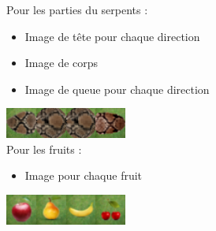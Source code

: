\documentclass{beamer}
\begin{document}
\begin{frame}
\frametitle{\insertsubsection}
\framesubtitle{\insertsection}
Pour les parties du serpents :
\begin{itemize}
\item Image de tête pour chaque direction  
\item Image de corps 
\item Image de queue pour chaque direction
\end{itemize}
\includegraphics[width=1cm, height=1cm]{../img/snake_queue_right.png}\includegraphics[width=1cm, height=1cm]{../img/corps.png}\includegraphics[width=1cm, height=1cm]{../img/corps.png}\includegraphics[width=1cm, height=1cm]{../img/snake_head_right.png}
\\
Pour les fruits :
\begin{itemize}
\item Image pour chaque fruit 
\end{itemize}
\includegraphics[width=1cm, height=1cm]{../img/pomme.png}\includegraphics[width=1cm, height=1cm]{../img/poire.png}\includegraphics[width=1cm, height=1cm]{../img/banane.png}\includegraphics[width=1cm, height=1cm]{../img/cerise.png}
\end{frame}
\end{document}
